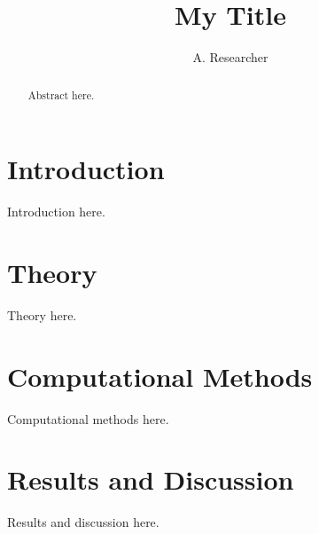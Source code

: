 \documentclass[aip,jcp,reprint,amsmath,amssymb]{revtex4-2}
\begin{document}
\title{My Title}

\author{A. Researcher}

\begin{abstract}
Abstract here.
\end{abstract}

\maketitle

\section{Introduction}
\label{sec:intro}
Introduction here.

\section{Theory}
\label{sec:theory}
Theory here.

\section{Computational Methods}
\label{sec:methods}
Computational methods here.

\section{Results and Discussion}
\label{sec:results}
Results and discussion here.
\end{document}
